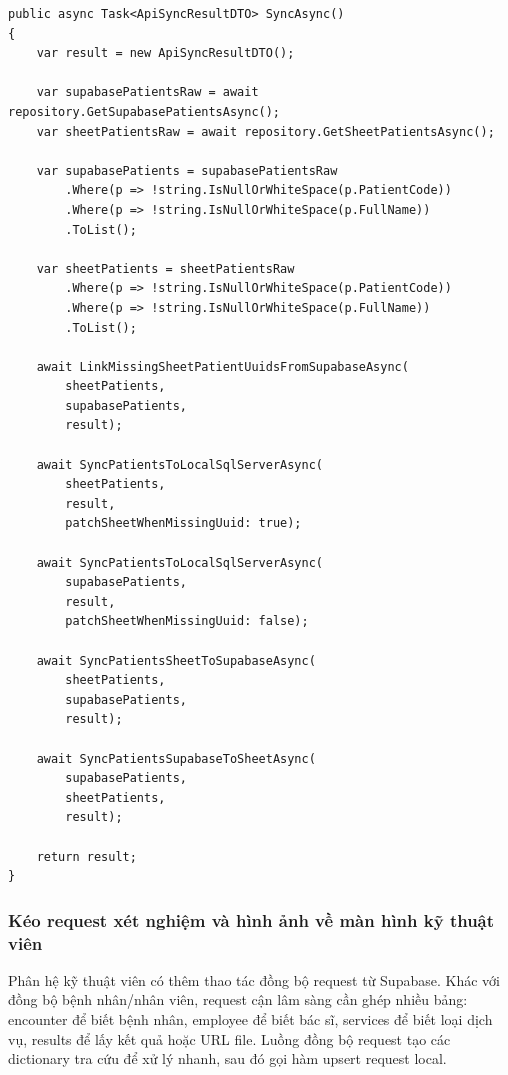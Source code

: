 \documentclass[12pt,a4paper]{article}
\numberwithin{figure}{subsection}
\numberwithin{table}{subsection}
\newcounter{codecounter}
\newenvironment{codeblock}[2]{%
    \refstepcounter{codecounter}%
    \phantomsection%
    \label{#1}%
    \par\smallskip
}{%
    \par\smallskip
}
\begin{document}
\begin{codeblock}{code:api-sync}{Luồng đồng bộ API}
\begin{verbatim}
public async Task<ApiSyncResultDTO> SyncAsync()
{
    var result = new ApiSyncResultDTO();

    var supabasePatientsRaw = await repository.GetSupabasePatientsAsync();
    var sheetPatientsRaw = await repository.GetSheetPatientsAsync();

    var supabasePatients = supabasePatientsRaw
        .Where(p => !string.IsNullOrWhiteSpace(p.PatientCode))
        .Where(p => !string.IsNullOrWhiteSpace(p.FullName))
        .ToList();

    var sheetPatients = sheetPatientsRaw
        .Where(p => !string.IsNullOrWhiteSpace(p.PatientCode))
        .Where(p => !string.IsNullOrWhiteSpace(p.FullName))
        .ToList();

    await LinkMissingSheetPatientUuidsFromSupabaseAsync(
        sheetPatients,
        supabasePatients,
        result);

    await SyncPatientsToLocalSqlServerAsync(
        sheetPatients,
        result,
        patchSheetWhenMissingUuid: true);

    await SyncPatientsToLocalSqlServerAsync(
        supabasePatients,
        result,
        patchSheetWhenMissingUuid: false);

    await SyncPatientsSheetToSupabaseAsync(
        sheetPatients,
        supabasePatients,
        result);

    await SyncPatientsSupabaseToSheetAsync(
        supabasePatients,
        sheetPatients,
        result);

    return result;
}
\end{verbatim}
\end{codeblock}

\subsubsection{Kéo request xét nghiệm và hình ảnh về màn hình kỹ thuật viên}

Phân hệ kỹ thuật viên có thêm thao tác đồng bộ request từ Supabase. Khác với đồng bộ bệnh nhân/nhân viên, request cận lâm sàng cần ghép nhiều bảng: encounter để biết bệnh nhân, employee để biết bác sĩ, services để biết loại dịch vụ, results để lấy kết quả hoặc URL file. Luồng đồng bộ request tạo các dictionary tra cứu để xử lý nhanh, sau đó gọi hàm upsert request local.
\end{document}
